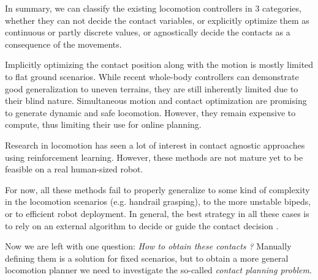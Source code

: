 
In summary, we can classify the existing locomotion controllers in 3 categories, whether they can not decide the contact variables, or explicitly optimize them as continuous or partly discrete values, or agnostically decide the contacts as a consequence of the movements.

Implicitly optimizing the contact position along with the motion is mostly limited to flat ground scenarios.
While recent whole-body controllers can demonstrate good generalization to uneven terrains, they are still inherently limited due to their blind nature.
Simultaneous motion and contact optimization are promising to generate dynamic and safe locomotion. 
However, they remain expensive to compute, thus limiting their use for online planning.

Research in locomotion has seen a lot of interest in contact agnostic approaches using reinforcement learning.
However, these methods are not mature yet to be feasible on a real human-sized robot.



For now, all these methods fail to properly generalize to some kind of complexity in the locomotion scenarios (e.g. handrail grasping), to the more unstable bipeds, or to efficient robot deployment.
In general, the best strategy in all these cases is to rely on an external algorithm to decide or guide the contact decision \cite{carpentier2016_versatile_efficient, pierre_alexandre_2021, ewen_2022}.

Now we are left with one question: \textit{How to obtain these contacts ?}
Manually defining them is a solution for fixed scenarios, but to obtain a more general locomotion planner we need to investigate the so-called \textit{contact planning problem}.


